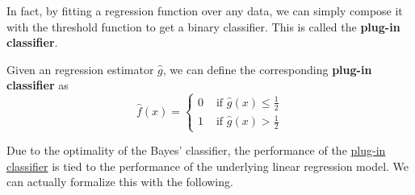 In fact, by fitting a regression function over any data, we can simply compose it with the threshold function to get a binary classifier. This is called the \textbf{plug-in classifier}. 

\begin{definition}
  \label{def:plug-in-classifier}
  Given an regression estimator $\hat{g}$, we can define the corresponding \textbf{plug-in classifier} as 
  \begin{equation}
    \hat{f}(x) = \begin{cases} 
      0 & \text{ if } \hat{g}(x) \leq \frac{1}{2} \\ 
      1 & \text{ if } \hat{g}(x) > \frac{1}{2} 
    \end{cases}
  \end{equation}
\end{definition}

Due to the optimality of the Bayes' classifier, the performance of the \hyperref[def:plug-in-classifier]{plug-in classifier} is tied to the performance of the underlying linear regression model. We can actually formalize this with the following. 

